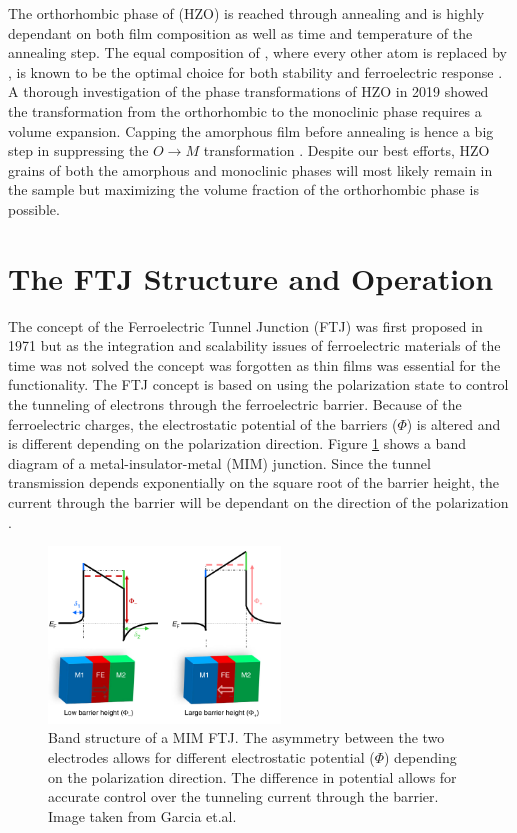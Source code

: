 \documentclass[11pt,twoside,final]{eitExjobb}  %
\begin{document}
The orthorhombic phase of  (HZO) is reached through
annealing and is highly dependant on both film composition as well as time and
temperature of the annealing step. The equal composition of
, where every other  atom is replaced by ,
is known to be the optimal choice for both stability and ferroelectric response
\cite{muller2012ferroelectricity}. A thorough investigation of the phase
transformations of HZO in 2019 showed the transformation from the orthorhombic
to the monoclinic phase requires a volume expansion. Capping the amorphous
film before annealing is hence a big step in suppressing the $O \rightarrow M$
transformation \cite{migita2019phase}. Despite our best efforts, HZO grains of
both the amorphous and monoclinic phases will most likely remain in the sample
but maximizing the volume fraction of the orthorhombic phase is possible.

\section{The FTJ Structure and Operation}

The concept of the Ferroelectric Tunnel Junction (FTJ) was first proposed in 1971
but as the integration and scalability issues of ferroelectric materials of the
time was not solved the concept was forgotten as thin films was essential for
the functionality. The FTJ concept is based on using the polarization state to
control the tunneling of electrons through the ferroelectric barrier. Because
of the ferroelectric charges, the electrostatic potential of the barriers
($\Phi$) is altered and is different depending on the polarization direction.
Figure \ref{fig:theo_FTJband} shows a band diagram of a metal-insulator-metal
(MIM) junction. Since the tunnel transmission depends exponentially on the
square root of the barrier height, the current through the barrier will be
dependant on the direction of the polarization \cite{garcia2014ferroelectric}. 

\begin{figure}[htbp]
    \centering
    \includegraphics[width=0.55\textwidth]{fig/img/FTJbandstructure.png}
    \caption{Band structure of a MIM FTJ. The asymmetry between the two
        electrodes allows for different electrostatic potential ($\Phi$)
        depending on the polarization direction. The difference in potential
        allows for accurate control over the tunneling current through the
        barrier. Image taken from Garcia et.al. \cite{garcia2014ferroelectric}}
    \label{fig:theo_FTJband}
\end{figure}
\end{document}
